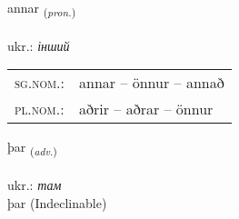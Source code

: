 \documentclass[frontgrid, backgrid]{flacards}\usepackage[]{graphicx}\usepackage[]{xcolor}
\begin{document}
\renewcommand{\flhead}{\vskip5pt \fboxsep=0pt {\small\bfseries\footnotesize Fornafn | займенник}}
\renewcommand{\fcfoot}{\vskip5pt \fboxsep=0pt \hspace{2pt}{\small\bfseries\footnotesize 1K}}

\renewcommand{\blhead}{\vskip5pt {\small\bfseries\footnotesize Fornafn | займенник }}
\renewcommand{\bcfoot}{\vskip5pt \hspace{2pt}{\small\bfseries\footnotesize 1K}}


{annar \small{\textsubscript{(\textit{pron.})}} \\[1ex] %
\textphonetic{[anar]} \\
ukr.: \emph{інший} \\  [2ex]
\renewcommand*{\arraystretch}{0.8}
\begin{tabular}{ll}
\textsc{sg.nom.}: & annar  --  önnur -- annað \\ 
\textsc{pl.nom.}: & aðrir -- aðrar -- önnur
\end{tabular}
}


\renewcommand{\flhead}{\vskip5pt \fboxsep=0pt {\small\bfseries\footnotesize Atviksorð | прислівник}}
\renewcommand{\fcfoot}{\vskip5pt \fboxsep=0pt \hspace{2pt}{\small\bfseries\footnotesize 1K}}

\renewcommand{\blhead}{\vskip5pt {\small\bfseries\footnotesize Atviksorð | прислівник }}
\renewcommand{\bcfoot}{\vskip5pt \hspace{2pt}{\small\bfseries\footnotesize 1K}}


{þar \small{\textsubscript{(\textit{adv.})}} \\[1ex]
\textphonetic{[θaːr]} \\
ukr.: \emph{там} \\  [2ex]
þar (Indeclinable)}


\renewcommand{\flhead}{\vskip5pt \fboxsep=0pt {\small\bfseries\footnotesize Forsetning | прийменник}}
\renewcommand{\fcfoot}{\vskip5pt \fboxsep=0pt \hspace{2pt}{\small\bfseries\footnotesize 1K}}
\end{document}

